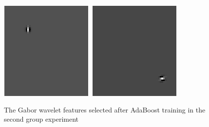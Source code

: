 \begin{figure}
\begin{center}
\includegraphics[width=\textwidth/9]{ch4/figures/Gabor7.png}
\includegraphics[width=\textwidth/9]{ch4/figures/Gabor8.png}\\
\caption{The Gabor wavelet features selected after AdaBoost training in the second group experiment}
\label{fig:resultlarge}
\end{center}
\end{figure}
